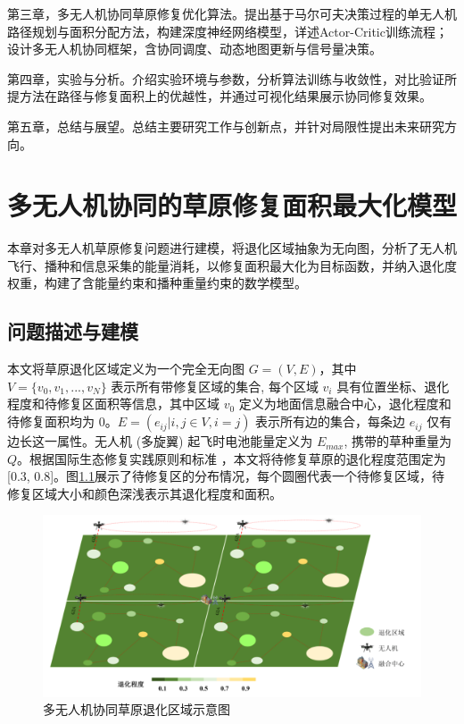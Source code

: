 \documentclass[AutoFakeBold]{LZUThesis}
\begin{document}
第三章，多无人机协同草原修复优化算法。提出基于马尔可夫决策过程的单无人机路径规划与面积分配方法，构建深度神经网络模型，详述Actor-Critic训练流程；设计多无人机协同框架，含协同调度、动态地图更新与信号量决策。

第四章，实验与分析。介绍实验环境与参数，分析算法训练与收敛性，对比验证所提方法在路径与修复面积上的优越性，并通过可视化结果展示协同修复效果。

第五章，总结与展望。总结主要研究工作与创新点，并针对局限性提出未来研究方向。

\chapter{多无人机协同的草原修复面积最大化模型}

本章对多无人机草原修复问题进行建模，将退化区域抽象为无向图，分析了无人机飞行、播种和信息采集的能量消耗，以修复面积最大化为目标函数，并纳入退化度权重，构建了含能量约束和播种重量约束的数学模型。
\section{问题描述与建模}

本文将草原退化区域定义为一个完全无向图 $G = (V, E)$，其中 $V = \{v_0, v_1, ..., v_N \}$ 表示所有带修复区域的集合, 每个区域 $v_i$ 具有位置坐标、退化程度和待修复区面积等信息，其中区域 $v_0$ 定义为地面信息融合中心，退化程度和待修复面积均为 0。$E = (e_{ij} |i, j \in V, i = j)$ 表示所有边的集合，每条边 $e_{ij}$ 仅有边长这一属性。无人机 (多旋翼) 起飞时电池能量定义为 $E_{max}$, 携带的草种重量为 $Q$。根据国际生态修复实践原则和标准\cite{gann2019international} ，本文将待修复草原的退化程度范围定为 [0.3, 0.8]。图\ref{fig:restored-areas}展示了待修复区的分布情况，每个圆圈代表一个待修复区域，待修复区域大小和颜色深浅表示其退化程度和面积。
\vspace{-10pt}
\begin{figure}[htbp]
	\centering
	\includegraphics[width=1\textwidth]{figures/多无人机修复退化区域实例.png}
	\caption{多无人机协同草原退化区域示意图}
	\label{fig:restored-areas}
\end{figure}
\vspace{-7pt}
\end{document}

